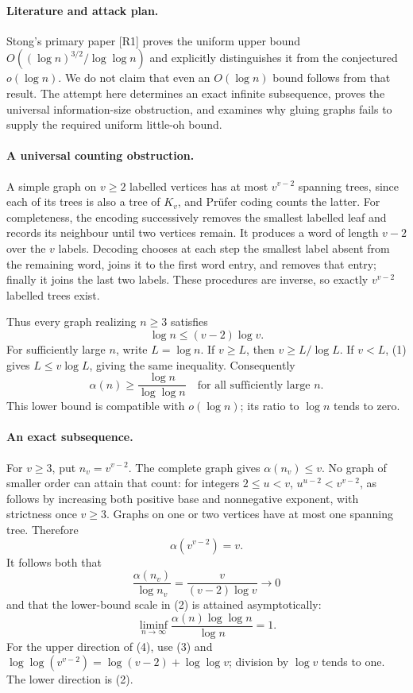 \documentclass[11pt,a4paper]{article}
\begin{document}
\paragraph{Literature and attack plan.}
Stong's primary paper [R1] proves the uniform upper bound $O((\log n)^{3/2}/\log\log n)$ and explicitly distinguishes it from the conjectured $o(\log n)$. We do not claim that even an $O(\log n)$ bound follows from that result. The attempt here determines an exact infinite subsequence, proves the universal information-size obstruction, and examines why gluing graphs fails to supply the required uniform little-oh bound.

\paragraph{A universal counting obstruction.}
A simple graph on $v\ge2$ labelled vertices has at most $v^{v-2}$ spanning trees, since each of its trees is also a tree of $K_v$, and Prüfer coding counts the latter. For completeness, the encoding successively removes the smallest labelled leaf and records its neighbour until two vertices remain. It produces a word of length $v-2$ over the $v$ labels. Decoding chooses at each step the smallest label absent from the remaining word, joins it to the first word entry, and removes that entry; finally it joins the last two labels. These procedures are inverse, so exactly $v^{v-2}$ labelled trees exist.

Thus every graph realizing $n\ge3$ satisfies
\[
 \log n\le(v-2)\log v. \tag{1}
\]
For sufficiently large $n$, write $L=\log n$. If $v\ge L$, then $v\ge L/\log L$. If $v<L$, (1) gives $L\le v\log L$, giving the same inequality. Consequently
\[
 \alpha(n)\ge\frac{\log n}{\log\log n}
 \quad\text{for all sufficiently large }n. \tag{2}
\]
This lower bound is compatible with $o(\log n)$; its ratio to $\log n$ tends to zero.

\paragraph{An exact subsequence.}
For $v\ge3$, put $n_v=v^{v-2}$. The complete graph gives $\alpha(n_v)\le v$. No graph of smaller order can attain that count: for integers $2\le u<v$, $u^{u-2}<v^{v-2}$, as follows by increasing both positive base and nonnegative exponent, with strictness once $v\ge3$. Graphs on one or two vertices have at most one spanning tree. Therefore
\[
 \alpha(v^{v-2})=v. \tag{3}
\]
It follows both that
\[
 \frac{\alpha(n_v)}{\log n_v}
 =\frac{v}{(v-2)\log v}\longrightarrow0
\]
and that the lower-bound scale in (2) is attained asymptotically:
\[
 \liminf_{n\to\infty}
 \frac{\alpha(n)\log\log n}{\log n}=1. \tag{4}
\]
For the upper direction of (4), use (3) and
$\log\log(v^{v-2})=\log(v-2)+\log\log v$; division by $\log v$ tends to one. The lower direction is (2).
\end{document}

